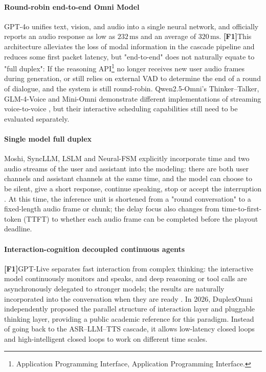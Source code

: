 \documentclass[UTF8,fontset=none,a4paper,10pt]{ctexart}
\newcommand{\FOne}{\textcolor{official}{\textbf{[F1]}}}
\newcommand{\ms}{\,\mathrm{ms}}
\begin{document}
\paragraph{Round-robin end-to-end Omni Model}
GPT-4o unifies text, vision, and audio into a single neural network, and officially reports an audio response as low as $232\ms$ and an average of $320\ms$\cite{openai2024gpt4osystemcard}. \FOne This architecture alleviates the loss of modal information in the cascade pipeline and reduces some first packet latency, but "end-to-end" does not naturally equate to "full duplex": If the reasoning API\footnote{Application Programming Interface, Application Programming Interface. } no longer receives new user audio frames during generation, or still relies on external VAD to determine the end of a round of dialogue, and the system is still round-robin. Qwen2.5-Omni's Thinker--Talker, GLM-4-Voice and Mini-Omni demonstrate different implementations of streaming voice-to-voice \cite{xu2025qwenomni,zeng2024glm4voice,xie2024miniomni}, but their interactive scheduling capabilities still need to be evaluated separately.

\paragraph{Single model full duplex}
Moshi, SyncLLM, LSLM and Neural-FSM explicitly incorporate time and two audio streams of the user and assistant into the modeling: there are both user channels and assistant channels at the same time, and the model can choose to be silent, give a short response, continue speaking, stop or accept the interruption \cite{defossez2024moshi,veluri2024syncllm,ma2025lslm,wang2024neuralfsm}. At this time, the inference unit is shortened from a "round conversation" to a fixed-length audio frame or chunk; the delay focus also changes from time-to-first-token (TTFT) to whether each audio frame can be completed before the playout deadline.

\paragraph{Interaction-cognition decoupled continuous agents}
\FOne GPT-Live separates fast interaction from complex thinking: the interactive model continuously monitors and speaks, and deep reasoning or tool calls are asynchronously delegated to stronger models; the results are naturally incorporated into the conversation when they are ready \cite{openai2026gptlive,openai2026continuous}. In 2026, DuplexOmni independently proposed the parallel structure \cite{huang2026duplexomni} of interaction layer and pluggable thinking layer, providing a public academic reference for this paradigm. Instead of going back to the ASR--LLM--TTS cascade, it allows low-latency closed loops and high-intelligent closed loops to work on different time scales.
\end{document}
